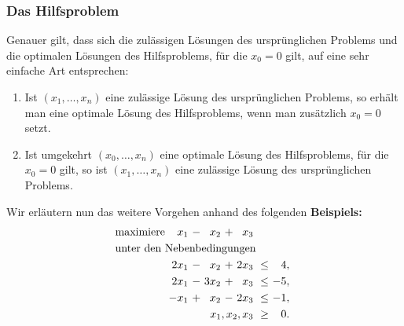 \documentclass[smaller]{beamer}
\begin{document}
\begin{frame}
 \frametitle{Das Hilfsproblem}
 Genauer gilt, dass sich die zulässigen Lösungen des ursprünglichen Problems und die optimalen Lösungen des Hilfsproblems, für die $x_0=0$ gilt, auf eine sehr einfache Art entsprechen:
\begin{enumerate}[1)]
\item Ist $(x_1,\ldots,x_n)$ eine zulässige Lösung des ursprünglichen Problems, so erhält man eine optimale Lösung des Hilfsproblems, wenn man zusätzlich $x_0=0$ setzt.
\item \label{page:3:1} Ist umgekehrt $(x_0,\ldots,x_n)$ eine optimale Lösung des Hilfsproblems, für die $x_0=0$ gilt, so ist $(x_1,\ldots,x_n)$ eine zulässige Lösung des ursprünglichen Problems.
\end{enumerate}
Wir erläutern nun das weitere Vorgehen anhand des folgenden \textbf{Beispiels:}
\begin{align*}
\begin{alignedat}{5}
& \text{maximiere } & x_1 &\ - &\ x_2 &\ + &\ x_3 & & \\
& \rlap{unter den Nebenbedingungen} & & & & & & & \\
&& 2x_1 &\ - &\  x_2 &\ + &\ 2x_3 &\ \leq &\  4,\ \\ 
&& 2x_1 &\ - &\ 3x_2 &\ + &\  x_3 &\ \leq &\ -5,\ \\ 
&& -x_1 &\ + &\  x_2 &\ - &\ 2x_3 &\ \leq &\ -1,\ \\ 
&& & & & & \llap{$x_1,x_2,x_3$} &\ \geq &\ 0.\
\end{alignedat}
\end{align*}
\end{frame}
\end{document}
